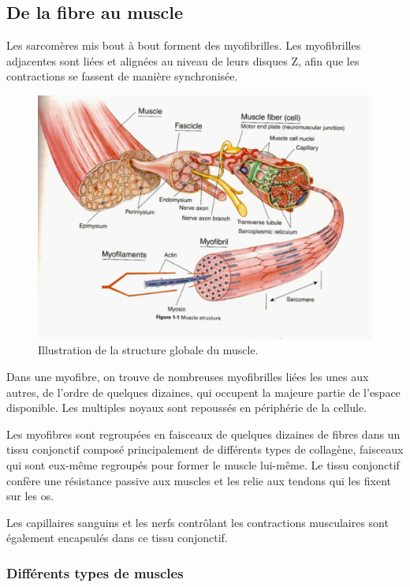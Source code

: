 \subsection{De la fibre au muscle}

Les sarcomères mis bout à bout  forment des myofibrilles. Les myofibrilles adjacentes sont liées et alignées au niveau de leurs disques Z, afin que les contractions se fassent de manière synchronisée. 

\begin{figure}
\includegraphics[scale=0.5]{Figures/12_29_0.png} 
 \caption{Illustration de la structure globale du muscle.}
\end{figure}

Dans une myofibre, on trouve de nombreuses myofibrilles liées les unes aux autres, de l'ordre de quelques dizaines, qui occupent la majeure partie de l'espace disponible. Les multiples noyaux sont repoussés en périphérie de la cellule. 

Les myofibres sont regroupées en faisceaux de quelques dizaines de fibres dans un tissu conjonctif composé principalement de différents types de collagène, faisceaux qui sont eux-même regroupés pour former le muscle lui-même. Le tissu conjonctif confère une résistance passive aux muscles et les relie aux tendons qui les fixent sur les os. 

Les capillaires sanguins et les nerfs contrôlant les contractions musculaires sont également encapsulés dans ce tissu conjonctif. 
\subsubsection{Différents types de muscles}

